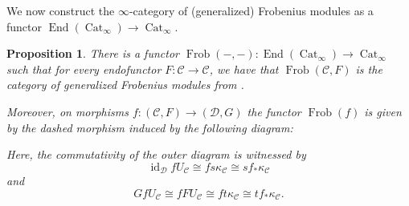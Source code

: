 \documentclass{article}
\theoremstyle{definition}
\theoremstyle{definition}
\theoremstyle{definition}
\theoremstyle{plain}
\theoremstyle{plain}
\theoremstyle{plain}
\theoremstyle{plain}
\theoremstyle{plain}
\theoremstyle{plain}
\newtheorem{prop}[defn]{Proposition}
\theoremstyle{plain}
\theoremstyle{plain}
\theoremstyle{remark}
\theoremstyle{remark}
\theoremstyle{plain}
\theoremstyle{plain}
\theoremstyle{plain}
\theoremstyle{plain}
\theoremstyle{plain}
\newcommand{\id}[1]{\operatorname{id}_{#1}}
\newcommand{\cartsymb}{\arrow[dr, phantom,"\scalebox{1.5}{\color{black}$\lrcorner$}", near start, color=black]}
\newcommand{\Frob}[2]{\operatorname{Frob}(#1, #2)}
\newcommand{\FrobSingle}[1]{\operatorname{Frob}(#1)}
\newcommand{\End}[1]{\operatorname{End}(#1)}
\newcommand{\Cat}[1]{\mathcal{#1}}
\newcommand{\Fun}[2]{\operatorname{Fun}({#1},{#2})}
\newcommand{\CatInf}{\operatorname{Cat}_{\infty}}
\begin{document}
We now construct the $\infty$-category of (generalized) Frobenius modules 
as a functor $\End{\CatInf} \to \CatInf$.
\begin{prop} \label{lem:functoriality:frob-functor}
    There is a functor $\Frob{-}{-} \colon \End{\CatInf} \to \CatInf$
    such that for every endofunctor $F \colon \Cat C \to \Cat C$,
    we have that $\Frob{\Cat C}{F}$ is the category of generalized Frobenius modules 
    from \cite[Definition 2.4]{cartmod}.

    Moreover, on morphisms $f \colon (\Cat C, F) \to (\Cat D, G)$ the functor $\FrobSingle{f}$ is given by the dashed morphism induced by the following diagram:
    \begin{center}
    \end{center}
    Here, the commutativity of the outer diagram is witnessed by
    \begin{equation*}
        \id{\Cat D} fU_{\Cat C} \cong fs\kappa_{\Cat C} \cong s f_* \kappa_{\Cat C}
    \end{equation*}
    and
    \begin{equation*}
        GfU_{\Cat C} \cong fFU_{\Cat C} \cong ft\kappa_{\Cat C} \cong t f_* \kappa_{\Cat C}.
    \end{equation*}
\end{prop}
\end{document}
